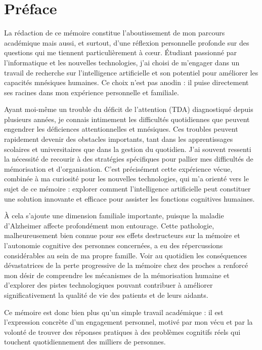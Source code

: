 \documentclass[11pt,a4paper]{report}
\begin{document}
\chapter*{Préface}

La rédaction de ce mémoire constitue l’aboutissement de mon parcours académique mais aussi, et surtout, d’une réflexion personnelle profonde sur des questions qui me tiennent particulièrement à cœur. Étudiant passionné par l'informatique et les nouvelles technologies, j’ai choisi de m’engager dans un travail de recherche sur l’intelligence artificielle et son potentiel pour améliorer les capacités mnésiques humaines. Ce choix n’est pas anodin : il puise directement ses racines dans mon expérience personnelle et familiale.

Ayant moi-même un trouble du déficit de l’attention (TDA) diagnostiqué depuis plusieurs années, je connais intimement les difficultés quotidiennes que peuvent engendrer les déficiences attentionnelles et mnésiques. Ces troubles peuvent rapidement devenir des obstacles importants, tant dans les apprentissages scolaires et universitaires que dans la gestion du quotidien. J’ai souvent ressenti la nécessité de recourir à des stratégies spécifiques pour pallier mes difficultés de mémorisation et d’organisation. C’est précisément cette expérience vécue, combinée à ma curiosité pour les nouvelles technologies, qui m’a orienté vers le sujet de ce mémoire : explorer comment l’intelligence artificielle peut constituer une solution innovante et efficace pour assister les fonctions cognitives humaines.

À cela s’ajoute une dimension familiale importante, puisque la maladie d’Alzheimer affecte profondément mon entourage. Cette pathologie, malheureusement bien connue pour ses effets destructeurs sur la mémoire et l’autonomie cognitive des personnes concernées, a eu des répercussions considérables au sein de ma propre famille. Voir au quotidien les conséquences dévastatrices de la perte progressive de la mémoire chez des proches a renforcé mon désir de comprendre les mécanismes de la mémorisation humaine et d’explorer des pistes technologiques pouvant contribuer à améliorer significativement la qualité de vie des patients et de leurs aidants.

Ce mémoire est donc bien plus qu’un simple travail académique : il est l’expression concrète d’un engagement personnel, motivé par mon vécu et par la volonté de trouver des réponses pratiques à des problèmes cognitifs réels qui touchent quotidiennement des milliers de personnes.
\end{document}
